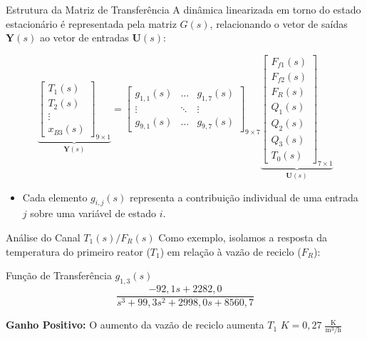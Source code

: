 \begin{frame}{Estrutura da Matriz de Transferência}
  A dinâmica linearizada em torno do estado estacionário é representada pela matriz $G(s)$, relacionando o vetor de saídas $\mathbf{Y}(s)$ ao vetor de entradas $\mathbf{U}(s)$:

  \begin{equation}
    \underbrace{
      \begin{bmatrix} T_1(s) \\ T_2(s) \\ \vdots \\ x_{B3}(s)
    \end{bmatrix}_{9 \times 1}}_{\mathbf{Y}(s)} =
    \begin{bmatrix}
      g_{1,1}(s) & \dots & g_{1,7}(s) \\
      \vdots & \ddots & \vdots \\
      g_{9,1}(s) & \dots & g_{9,7}(s)
    \end{bmatrix}_{9 \times 7}
    \underbrace{
      \begin{bmatrix} F_{f1}(s) \\ F_{f2}(s) \\ F_R(s) \\ Q_1(s) \\ Q_2(s) \\ Q_3(s) \\ T_0(s)
    \end{bmatrix}_{7 \times 1}}_{\mathbf{U}(s)}
  \end{equation}

  \begin{itemize}
    \item Cada elemento $g_{i,j}(s)$ representa a contribuição individual de uma entrada $j$ sobre uma variável de estado $i$.
  \end{itemize}
\end{frame}

\begin{frame}{Análise do Canal $T_1(s)/F_R(s)$}
  Como exemplo, isolamos a resposta da temperatura do primeiro reator ($T_1$) em relação à vazão de reciclo ($F_{R}$):
  \vskip 0.1cm
  \begin{block}{Função de Transferência $g_{1,3}(s)$}
    \begin{equation}
      \frac{- 92{,}1 s + 2282{,}0}{s^{3} + 99{,}3 s^{2} + 2998{,}0 s + 8560{,}7}
    \end{equation}
  \end{block}
  \textbf{Ganho Positivo:} O aumento da vazão de reciclo aumenta $T_1$
  \vskip 0.1cm
  $K = 0{,}27 \;\frac{\mathrm{K}}{\mathrm{m^3/h}}$
\end{frame}

